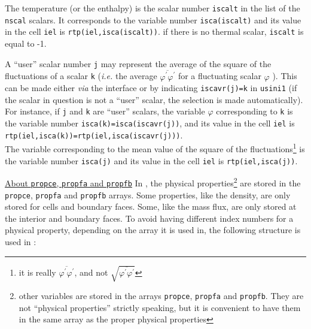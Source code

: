 {{{\begin{list}{-}{}
\item The temperature (or the enthalpy) is the scalar number
      \texttt{iscalt} in the list of the \texttt{nscal}
      scalars. It corresponds to the variable number \texttt{isca(iscalt)}
      and its value in the cell \texttt{iel} is
      \texttt{rtp(iel,isca(iscalt))}. if there is no thermal scalar,
      \texttt{iscalt} is equal to -1.
\item A ``user'' scalar number \texttt{j} may represent the average of the
      square of the fluctuations of a scalar \texttt{k} ({\em i.e.} the average
      $\overline{\varphi^\prime\varphi^\prime}$ for a fluctuating scalar
      $\varphi$ ). This can be made either {\em via} the
      interface or by indicating \texttt{iscavr(j)=k} in
      \texttt{usini1} (if the scalar in question is not a ``user''
      scalar, the selection is made automatically). For instance, if \texttt{j}
      and \texttt{k} are ``user'' scalars, the variable $\varphi$ corresponding
      to \texttt{k} is the variable number \texttt{isca(k)=isca(iscavr(j))},
      and its value in the cell \texttt{iel} is \\
      \texttt{rtp(iel,isca(k))=rtp(iel,isca(iscavr(j)))}. \\
The variable corresponding to the mean value of the square of the
      fluctuations\footnote{it is really
      $\overline{\varphi^\prime\varphi^\prime}$, and not
      $\displaystyle\sqrt{\overline{\varphi^\prime\varphi^\prime}}$} is
      the variable number \texttt{isca(j)} and its value in the cell \texttt{iel}
      is \texttt{rtp(iel,isca(j))}.
\end{list}

\bigskip

\underline{About \texttt{propce}, \texttt{propfa} and \texttt{propfb}}
In \CS, the physical properties\footnote{other variables are stored in the
arrays \texttt{propce}, \texttt{propfa} and \texttt{propfb}. They are not
``physical properties'' strictly speaking, but it is convenient to have them
in the same array as the proper physical properties} are stored in the
\texttt{propce}, \texttt{propfa} and \texttt{propfb} arrays.
Some properties, like the density, are only stored for cells and boundary
faces. Some, like the mass flux, are only stored at the interior and boundary
faces. To avoid having different index numbers for a physical property,
depending on the array it is used in, the following structure is used in \CS:

\begin{list}{-}{}


\end{list}}}}
